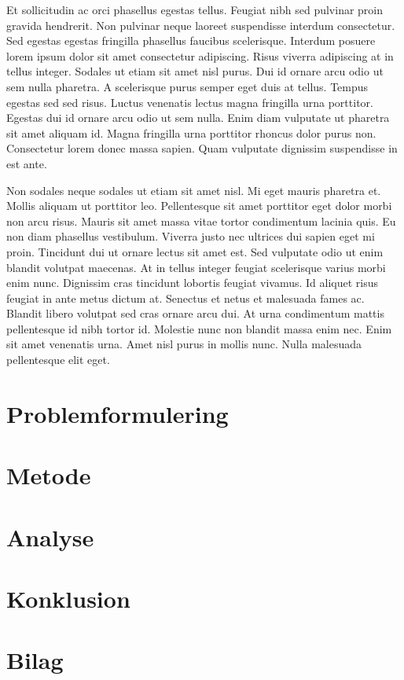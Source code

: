 \documentclass[12pt,a4paper]{article}
\begin{document}
Et sollicitudin ac orci phasellus egestas tellus. Feugiat nibh sed pulvinar proin gravida hendrerit. Non pulvinar neque laoreet suspendisse interdum consectetur. Sed egestas egestas fringilla phasellus faucibus scelerisque. Interdum posuere lorem ipsum dolor sit amet consectetur adipiscing. Risus viverra adipiscing at in tellus integer. Sodales ut etiam sit amet nisl purus. Dui id ornare arcu odio ut sem nulla pharetra. A scelerisque purus semper eget duis at tellus. Tempus egestas sed sed risus. Luctus venenatis lectus magna fringilla urna porttitor. Egestas dui id ornare arcu odio ut sem nulla. Enim diam vulputate ut pharetra sit amet aliquam id. Magna fringilla urna porttitor rhoncus dolor purus non. Consectetur lorem donec massa sapien. Quam vulputate dignissim suspendisse in est ante.

Non sodales neque sodales ut etiam sit amet nisl. Mi eget mauris pharetra et. Mollis aliquam ut porttitor leo. Pellentesque sit amet porttitor eget dolor morbi non arcu risus. Mauris sit amet massa vitae tortor condimentum lacinia quis. Eu non diam phasellus vestibulum. Viverra justo nec ultrices dui sapien eget mi proin. Tincidunt dui ut ornare lectus sit amet est. Sed vulputate odio ut enim blandit volutpat maecenas. At in tellus integer feugiat scelerisque varius morbi enim nunc. Dignissim cras tincidunt lobortis feugiat vivamus. Id aliquet risus feugiat in ante metus dictum at. Senectus et netus et malesuada fames ac. Blandit libero volutpat sed cras ornare arcu dui. At urna condimentum mattis pellentesque id nibh tortor id. Molestie nunc non blandit massa enim nec. Enim sit amet venenatis urna. Amet nisl purus in mollis nunc. Nulla malesuada pellentesque elit eget.

\newpage
\section{Problemformulering}
\newpage
\section{Metode}
\newpage
\section{Analyse}
\newpage
\section{Konklusion}
\newpage





\newpage
\section*{Bilag}
\end{document}
